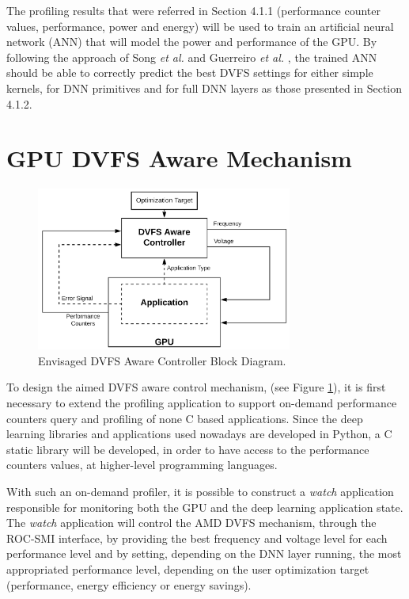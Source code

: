 The profiling results that were referred in Section 4.1.1 (performance counter values, performance, power and energy) will be used to train an artificial neural network (ANN) that will model the power and performance of the GPU. By following the approach of Song \textit{et al.} \cite{song_simplified_2013} and Guerreiro  \textit{et al.} \cite{guerreiro_modeling_2019}, the trained ANN should be able to correctly predict the best DVFS settings for either simple kernels, for DNN primitives and for full DNN layers as those presented in Section 4.1.2.

\section{GPU DVFS Aware Mechanism}
\label{section:DVFSaware}

\begin{figure}[!htb]
  \centering
  \includegraphics[width=0.75\textwidth]{Figures/Proposel/DVFS_Aware_Controller.png}
  \caption[Controller]{Envisaged DVFS Aware Controller Block Diagram.}
  \label{fig:controlerDVFSaware}
\end{figure}

To design the aimed DVFS aware control mechanism, (see Figure \ref{fig:controlerDVFSaware}), it is first necessary to extend the profiling application to support on-demand performance counters query and profiling of none C based applications. Since the deep learning libraries and applications used nowadays are developed in Python, a C static library will be developed, in order to have access to the performance counters values, at higher-level programming languages.

With such an on-demand profiler, it is possible to construct a \textit{watch} application responsible for monitoring both the GPU and the deep learning application state. The \textit{watch} application will control the AMD DVFS mechanism, through the ROC-SMI interface, by providing the best frequency and voltage level for each performance level and by setting, depending on the DNN layer running, the most appropriated performance level, depending on the user optimization target (performance, energy efficiency or energy savings).

